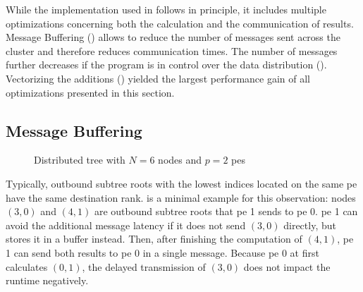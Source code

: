 While the implementation used in  follows  in principle, it includes multiple optimizations concerning both the calculation and the communication of results.
Message Buffering () allows to reduce the number of messages sent across the cluster and therefore reduces communication times.
The number of messages further decreases if the program is in control over the data distribution ().
Vectorizing the additions () yielded the largest performance gain of all optimizations presented in this section.

\subsection{Message Buffering}
\label{sec:MessageBuffering}

\begin{figure}[H]
\centering
{}
\caption{Distributed tree with $N=6$ nodes and $p=2$ \glspl{pe}}
\label{fig:messageBufferingTree}
\end{figure}

Typically, outbound subtree roots with the lowest indices located on the same \gls{pe} have the same destination rank.
 is a minimal example for this observation: nodes $(3,0)$ and $(4,1)$ are outbound subtree roots that \gls{pe} 1 sends to \gls{pe} 0.
\gls{pe} 1 can avoid the additional message latency if it does not send $(3,0)$ directly, but stores it in a buffer instead.
Then, after finishing the computation of $(4,1)$, \gls{pe} 1 can send both results to \gls{pe} 0 in a single message.
Because \gls{pe} 0 at first calculates $(0,1)$, the delayed transmission of $(3,0)$ does not impact the runtime negatively.

